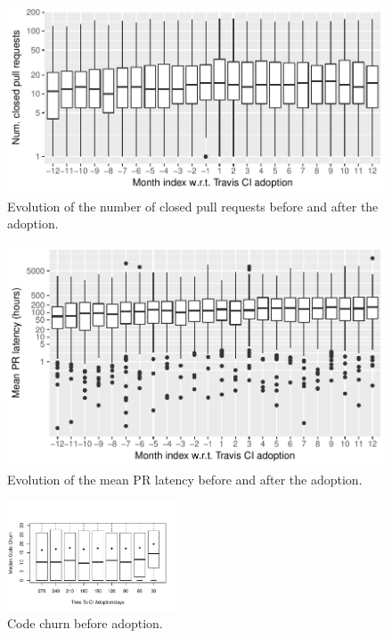 \begin{figure}[t]
\centering
\includegraphics[width=\columnwidth, clip=true, trim=0 0 0 0]{figures/prs-full.pdf}
\caption{Evolution of the number of closed pull requests before and after the \Tvis adoption.}
\label{fig:prs}
\end{figure}


\begin{figure}[t]
\centering
\includegraphics[width=\columnwidth, clip=true, trim=0 0 0 0]{figures/pr-latency-mean.pdf}
\caption{Evolution of the mean PR latency before and after the \Tvis adoption.}
\label{fig:pr-latency}
\end{figure}







\begin{figure}[t]
\centering
\includegraphics[width=0.45\textwidth, clip=true, trim=0 15 15 50]{churn_before.pdf}
\caption{Code churn before \Tvis adoption.}
\label{Fig:CodeChurnBefore}\vspace{-0.3cm}
\end{figure}


